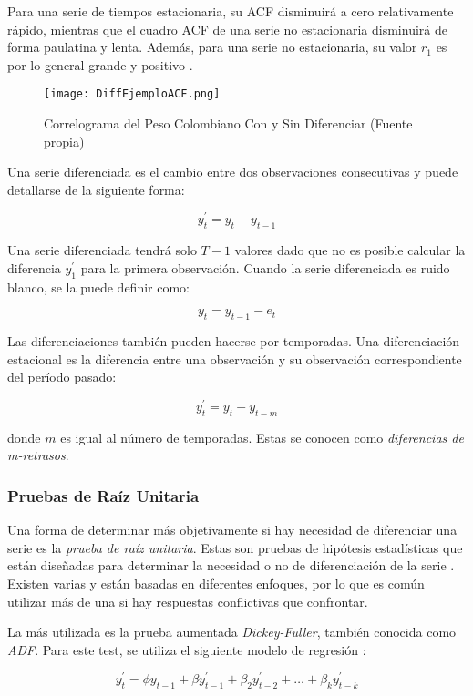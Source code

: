 Para una serie de tiempos estacionaria, su ACF disminuirá a cero relativamente rápido, mientras que el cuadro ACF de una serie no estacionaria disminuirá de forma paulatina y lenta. Además, para una serie no estacionaria, su valor $r_1$ es por lo general grande y positivo \cite{hyndman}.

\begin{figure}[h!]
    \centering
    \texttt{[image: DiffEjemploACF.png]}
    \caption{Correlograma del Peso Colombiano Con y Sin Diferenciar (Fuente propia)}
\end{figure}

Una serie diferenciada es el cambio entre dos observaciones consecutivas y puede detallarse de la siguiente forma:

\[ y_{t}^{\prime} = y_{t} - y_{t-1} \]

Una serie diferenciada tendrá solo $T-1$ valores dado que no es posible calcular la diferencia $y_{1}^{\prime}$ para la primera observación. Cuando la serie diferenciada es ruido blanco, se la puede definir como:

\[ y_{t} = y_{t-1} - e_{t} \]

Las diferenciaciones también pueden hacerse por temporadas. Una diferenciación estacional es la diferencia entre una observación y su observación correspondiente del período pasado:

\[ y_{t}^{\prime} = y_{t} - y_{t-m} \]

donde $m$ es igual al número de temporadas. Estas se conocen como \emph{diferencias de m-retrasos}.

\subsubsection{Pruebas de Raíz Unitaria}
Una forma de determinar más objetivamente si hay necesidad de diferenciar una serie es la \emph{prueba de raíz unitaria}. Estas son pruebas de hipótesis estadísticas que están diseñadas para determinar la necesidad o no de diferenciación de la serie \cite{hyndman}. Existen varias y están basadas en diferentes enfoques, por lo que es común utilizar más de una si hay respuestas conflictivas que confrontar.

La más utilizada es la prueba aumentada \emph{Dickey-Fuller}, también conocida como \emph{ADF}. Para este test, se utiliza el siguiente modelo de regresión \cite{dickeyfuller}:

\[ y_{t}^{\prime} = \phi y_{t-1} + \beta y_{t-1}^{\prime} + \beta_{2} y_{t-2}^{\prime} + \ldots + \beta_{k} y_{t-k}^{\prime} \]

